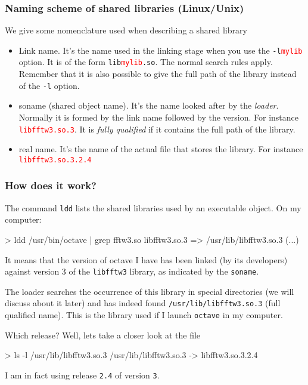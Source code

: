 \documentclass[9pt]{beamer}
\begin{document}
\begin{frame}
\frametitle{Naming scheme of shared libraries (Linux/Unix)}
We give some nomenclature used when describing a shared library

\begin{itemize}
\item \alert{Link name}. It's the name used in the linking stage when
  you use the \texttt{-l\textcolor{red}{mylib}} option.  It is of the
  form \texttt{lib\textcolor{red}{mylib}.so}. The normal search rules
  apply. Remember that it is also possible to give the full path of
  the library instead of the \texttt{-l} option.
\item \alert{soname} (shared object name).  It's the name looked after
  by the \emph{loader}.  Normally it is formed by the link name
  followed by the version.  For instance
  \texttt{\textcolor{red}{libfftw3.so.3}}. It is \emph{fully
    qualified} if it contains the full path of the library.
\item \alert{real name}. It's the name of the actual file that stores the library. 
  For instance \texttt{\textcolor{red}{libfftw3.so.3.2.4}}
\end{itemize}
\end{frame}


\begin{frame}
  \frametitle{How does it work?}  The command
  \texttt{ldd} lists the shared libraries used by an executable object.
On my computer:
\begin{semiverbatim}
> ldd /usr/bin/octave | grep fftw3.so \newline
libfftw3.so.3 => /usr/lib/libfftw3.so.3 (...)
\end{semiverbatim}
It means that the version of octave I have has been linked (by its
developers) against version $3$ of the \texttt{libfftw3} library, 
as indicated by the \texttt{soname}.

The \alert{loader} searches the occurrence of this library in special
directories (we will discuss about it later) and has indeed found
\texttt{/usr/lib/libfftw3.so.3} (full qualified name). This is the library
used if I launch \texttt{octave} in my computer.  \smallskip

Which release? Well, lets take a closer look at the file
\begin{semiverbatim}
> ls -l /usr/lib/libfftw3.so.3\newline
/usr/lib/libfftw3.so.3 -> libfftw3.so.3.2.4
\end{semiverbatim}
I am in fact using release \texttt{2.4} of version \texttt{3}.
\end{frame}
\end{document}
